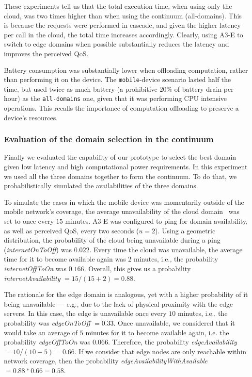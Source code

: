 These experiments tell us that the total execution time, when using only the cloud, was two times higher than when using the continuum (all-domains). This is because the requests were performed in cascade, and given the higher latency per call in the cloud, the total time increases accordingly. Clearly, using A3-E to switch to edge domains when possible substantially reduces the latency and improves the perceived QoS.

Battery consumption was substantially lower when offloading computation, rather than performing it on the device. The \texttt{mobile}-device scenario lasted half the time, but used twice as much battery (a prohibitive $20$\% of battery drain per hour) as the \texttt{all-domains} one, given that it was performing CPU intensive operations. This recalls the importance of computation offloading to preserve a device's resources.


\subsubsection{Evaluation of the domain selection in the continuum}

Finally we evaluated the capability of our prototype to select the best domain given low latency and  high computational power requirements. In this experiment we used all the three domains together to form the continuum. To do that, we probabilistically simulated the availabilities of the three domains. 

To simulate the cases in which the mobile device was momentarily outside of the mobile network's coverage, the average unavailability of the cloud domain~\cite{garcia2017bandwidth} was set to once every $15$ minutes. A3-E was configured to ping for domain availability, as well as perceived QoS, every two seconds ($u = 2$). Using a geometric distribution, the probability of the cloud being unavailable during a ping (\textit{internetOnToOff}) was $0.022$. Every time the cloud was unavailable, the average time for it to become available again was $2$ minutes, i.e., the probability  \textit{internetOffToOn} was $0.166$. Overall, this gives us a probability \textit{internetAvailability} $=15/(15+2)=0.88$.


The rationale for the edge domain is analogous, yet with a higher probability of it being unavailable --- e.g., due to the lack of physical proximity with the edge servers. In this case, the edge is unavailable once every $10$ minutes, i.e., the probability was \textit{edgeOnToOff}  $ = 0.33$. Once unavailable, we considered that it would take an average of $5$ minutes for it to become available again, i.e. the probability \textit{edgeOffToOn} was $0.066$. Therefore, the probability \textit{edgeAvailability} $=10/(10+5)=0.66$. If we consider that edge nodes are only reachable within network coverage, then the probability \textit{edgeAvailabilityWithAvailable}$=0.88*0.66=0.58$.

